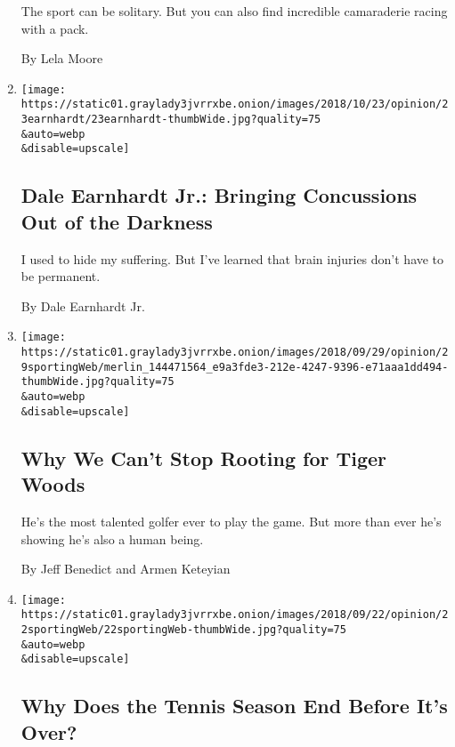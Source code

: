 \begin{enumerate}
  The sport can be solitary. But you can also find incredible
  camaraderie racing with a pack.

  By Lela Moore
\item
  \href{/2018/10/23/opinion/health/dale-earnhardt-jr-concussion-nascar-retirement.html}{}

  \texttt{[image: https://static01.graylady3jvrrxbe.onion/images/2018/10/23/opinion/23earnhardt/23earnhardt-thumbWide.jpg?quality=75\\\&auto=webp\\\&disable=upscale]}

  \hypertarget{dale-earnhardt-jr-bringing-concussions-out-of-the-darkness}{%
  \subsection{Dale Earnhardt Jr.: Bringing Concussions Out of the
  Darkness}\label{dale-earnhardt-jr-bringing-concussions-out-of-the-darkness}}

  I used to hide my suffering. But I've learned that brain injuries
  don't have to be permanent.

  By Dale Earnhardt Jr.
\item
  \href{/2018/09/29/opinion/tiger-woods-ryder-cup-golf.html}{}

  \texttt{[image: https://static01.graylady3jvrrxbe.onion/images/2018/09/29/opinion/29sportingWeb/merlin\_144471564\_e9a3fde3-212e-4247-9396-e71aaa1dd494-thumbWide.jpg?quality=75\\\&auto=webp\\\&disable=upscale]}

  \hypertarget{why-we-cant-stop-rooting-for-tiger-woods}{%
  \subsection{Why We Can't Stop Rooting for Tiger
  Woods}\label{why-we-cant-stop-rooting-for-tiger-woods}}

  He's the most talented golfer ever to play the game. But more than
  ever he's showing he's also a human being.

  By Jeff Benedict and Armen Keteyian
\item
  \href{/2018/09/22/opinion/laver-cup-federer-djokovic-tennis.html}{}

  \texttt{[image: https://static01.graylady3jvrrxbe.onion/images/2018/09/22/opinion/22sportingWeb/22sportingWeb-thumbWide.jpg?quality=75\\\&auto=webp\\\&disable=upscale]}

  \hypertarget{why-does-the-tennis-season-end-before-its-over}{%
  \subsection{Why Does the Tennis Season End Before It's
  Over?}\label{why-does-the-tennis-season-end-before-its-over}}


\end{enumerate}
